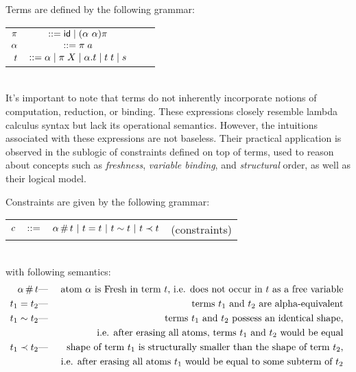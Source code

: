 \documentclass[english, mgr]{iithesis}
\begin{document}
Terms are defined by the following grammar:
\\
\begin{tabular}{rclr}
    $\pi$    & $::= \mathsf{id} \mid (\alpha\ \alpha) \pi$ \\
    $\alpha$ & $::= \pi \; a$ \\
    $t$    & $::= \alpha \mid \pi \; X \mid \alpha. t \mid t \; t \mid s$
\end{tabular}
\\

It's important to note that terms do not inherently incorporate notions of computation, reduction, or binding. These expressions closely resemble lambda calculus syntax but lack its operational semantics. However, the intuitions associated with these expressions are not baseless. Their practical application is observed in the sublogic of constraints defined on top of terms, used to reason about concepts such as \textit{freshness}, \textit{variable binding}, and \textit{structural} order, as well as their logical model.

Constraints are given by the following grammar:
\\
\begin{tabular}{rclr}
    $c$  & $::=$ & $\alpha \,\#\, t
                   \ |\  t = t
                   \ |\  t \sim t
                   \ |\  t \prec t$
        & (constraints)
\end{tabular}
\\
with following semantics:
\begin{eqnarray*}
  \alpha \,\#\, t & \text{---} & \text{
    atom $\alpha$ is {Fresh} in term $t$, i.e. does not occur in $t$
    as a free variable
  } \\
  t_1 = t_2 & \text{---} &\text{
    terms $t_1$ and $t_2$ are alpha-equivalent
  } \\
  t_1 \sim t_2 & \text{---} &\text{
    terms $t_1$ and $t_2$ possess an identical shape,
  } \\
  & & \text{
    i.e. after erasing all atoms, terms $t_1$ and $t_2$ would be equal
  } \\
  t_1 \prec t_2 & \text{---} &\text{
    shape of term $t_1$ is structurally smaller than the shape of term
    $t_2$,
  } \\
  & & \text{
    i.e. after erasing all atoms $t_1$ would be equal to some
    subterm of $t_2$
  } \\
\end{eqnarray*}
\end{document}

